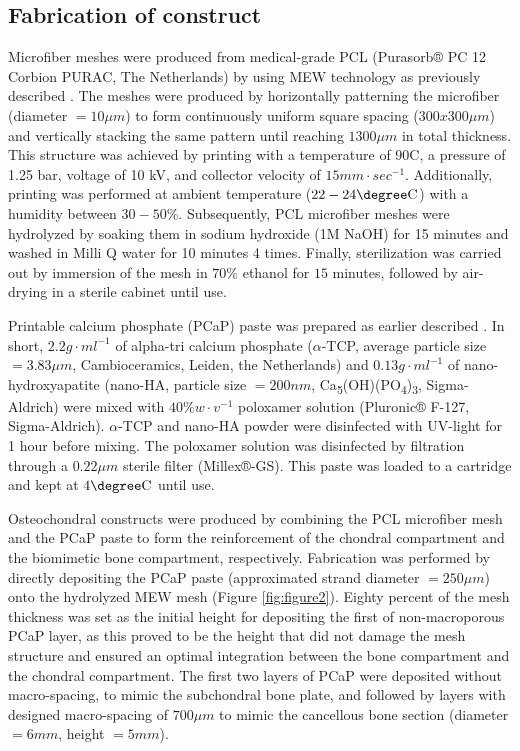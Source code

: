 \documentclass[twocolumn, empirical, authordate, issue]{jote-new-article}
\begin{document}
\subsection{Fabrication of construct} 

Microfiber meshes were produced from medical-grade PCL (Purasorb® PC 12 Corbion PURAC, The Netherlands) by using MEW technology as previously described \parencite{deRuijter2019}. The meshes were produced by horizontally patterning the microfiber (diameter $= 10 \mu m$) to form continuously uniform square spacing ($300x300 \mu m$) and vertically stacking the same pattern until reaching $1300 \mu m$ in total thickness. This structure was achieved by printing with a temperature of 90\degree C, a pressure of 1.25 bar, voltage of 10 kV, and collector velocity of $ 15 mm\cdot sec^{-1} $. Additionally, printing was performed at ambient temperature ($22 - 24 \degree \text{C}$) with a humidity between $30 - 50\%$. Subsequently, PCL microfiber meshes were hydrolyzed by soaking them in sodium hydroxide (1M NaOH) for 15 minutes and washed in Milli Q water for 10 minutes 4 times. Finally, sterilization was carried out by immersion of the mesh in $70\%$ ethanol for $15$ minutes, followed by air-drying in a sterile cabinet until use.

Printable calcium phosphate (PCaP) paste was prepared as earlier described \parencite{Diloksumpan2020}. In short, $2.2 g\cdot ml^{-1}$ of alpha-tri calcium phosphate ($\alpha$-TCP, average particle size $= 3.83 \mu m$, Cambioceramics, Leiden, the Netherlands) and $0.13 g\cdot ml^{-1}$ of nano-hydroxyapatite (nano-HA, particle size $=200 nm$, Ca\textsubscript{5}(OH)(PO\textsubscript{4})\textsubscript{3}, Sigma-Aldrich) were mixed with $40\% w\cdot v^{-1}$ poloxamer solution (Pluronic® F-127, Sigma-Aldrich). $\alpha$-TCP and nano-HA powder were disinfected with UV-light for 1 hour before mixing. The poloxamer solution was disinfected by filtration through a $0.22 \mu m$ sterile filter (Millex®-GS). This paste was loaded to a cartridge and kept at $4\degree \text{C}$ until use.

Osteochondral constructs were produced by combining the PCL microfiber mesh and the PCaP paste to form the reinforcement of the chondral compartment and the biomimetic bone compartment, respectively. Fabrication was performed by directly depositing the PCaP paste (approximated strand diameter $= 250 \mu m$) onto the hydrolyzed MEW mesh (Figure \ref{fig:figure2}). Eighty percent of the mesh thickness was set as the initial height for depositing the first of non-macroporous PCaP layer, as this proved to be the height that did not damage the mesh structure and ensured an optimal integration between the bone compartment and the chondral compartment. The first two layers of PCaP were deposited without macro-spacing, to mimic the subchondral bone plate, and followed by layers with designed macro-spacing of $700 \mu m$ to mimic the cancellous bone section (diameter $= 6 mm$, height $= 5 mm$).
\end{document}
